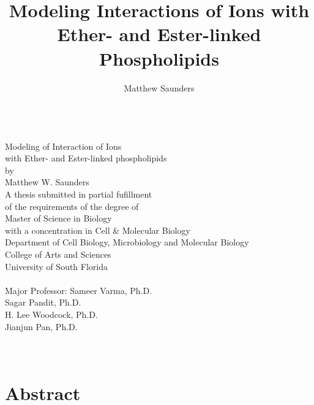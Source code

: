 \documentclass[12pt,openany,final]{book}
\author{Matthew Saunders}
\title{Modeling Interactions of Ions with Ether- and Ester-linked Phospholipids}
\begin{document}
\pagestyle{plain}
\begin{titlepage}
\begin{centering}
~\\[1in]
Modeling of Interaction of Ions \\[2\baselineskip] with Ether- and Ester-linked phospholipids
~\\[3\baselineskip]
by
~\\[3\baselineskip]
Matthew W. Saunders
~\\[4\baselineskip]
A thesis submitted in partial fufillment\\
of the requirements of the degree of\\
Master of Science in Biology \\ with a concentration in Cell \& Molecular Biology\\
Department of Cell Biology, Microbiology and Molecular Biology\\
College of Arts and Sciences\\
University of South Florida\\
~\\[2\baselineskip]
Major Professor: Sameer Varma, Ph.D.\\
Sagar Pandit, Ph.D.\\
H. Lee Woodcock, Ph.D.\\
Jianjun Pan, Ph.D.\\
~\\[2\baselineskip]
~\\[3\baselineskip]
\end{centering}
\end{titlepage}
\doublespacing
\tableofcontents
{}
\listoftables
\listoffigures

\doublespacing
\chapter*{Abstract}
\end{document}
